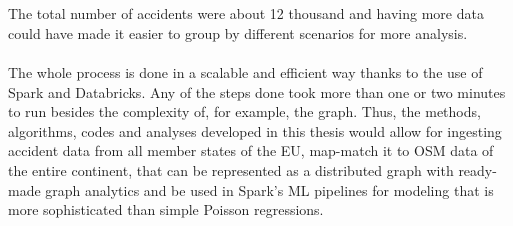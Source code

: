 \\
\\
The total number of accidents were about 12 thousand and having more data could have made it easier to group by different scenarios for more analysis.
\\
\\
The whole process is done in a scalable and efficient way thanks to the use of Spark and Databricks. Any of the steps done took more than one or two minutes to run besides the complexity of, for example, the graph.
Thus, the methods, algorithms, codes and analyses developed in this thesis would allow for ingesting accident data from all member states of the \ac{EU}, map-match it to \ac{OSM} data of the entire continent, that can be represented as a distributed graph with ready-made graph analytics and be used in Spark's ML pipelines for modeling that is more sophisticated than simple Poisson regressions.


\begin{comment}

The results presented in Chapter 4 are discussed and analyzed, including comments and reflections from the author. It may include the following: Comparison of obtained results with discussion,interpretation and evaluation of results. Results of analysis or modeling are described. Interpretations are drawn and connected to previous work
\end{comment}